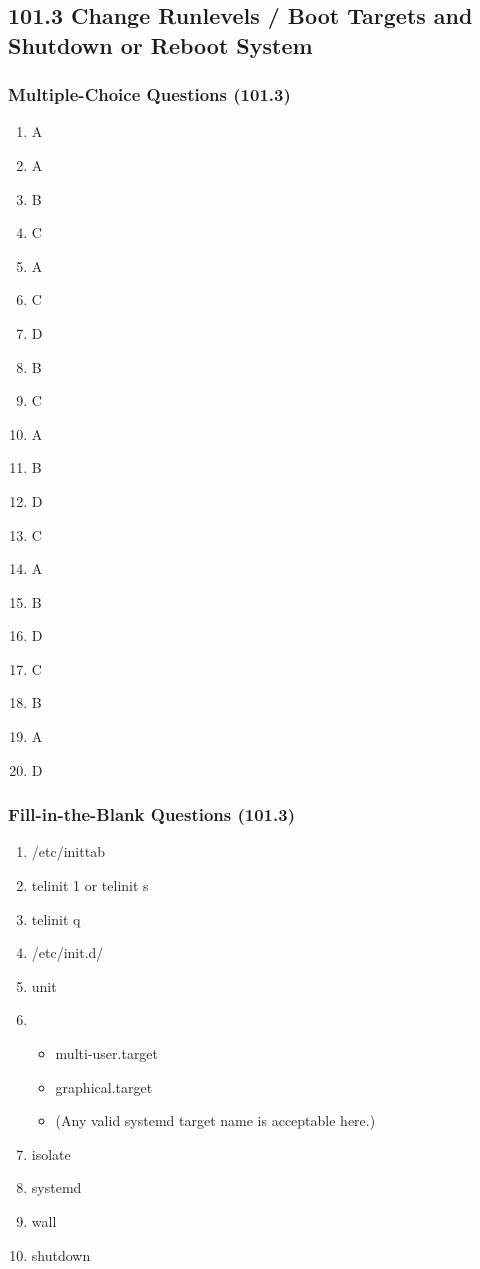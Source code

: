 \documentclass[a4paper]{report}
\begin{document}


    \subsection*{101.3 Change Runlevels / Boot Targets and Shutdown or Reboot System}
    \subsubsection*{Multiple-Choice Questions (101.3)}
    \begin{enumerate}[1.]
    \item A
    \item A
    \item B
    \item C
    \item A
    \item C
    \item D
    \item B
    \item C
    \item A
    \item B
    \item D
    \item C
    \item A
    \item B
    \item D
    \item C
    \item B
    \item A
    \item D
    \end{enumerate}



\subsubsection*{Fill-in-the-Blank Questions (101.3)}
    \begin{enumerate}[1.]
    \item /etc/inittab
    \item telinit 1 or telinit s
    \item telinit q
    \item /etc/init.d/
    \item unit
    \item 
        \begin{itemize}
            \item multi-user.target
            \item graphical.target
            \item (Any valid systemd target name is acceptable here.)
        \end{itemize}
    \item isolate
    \item systemd
    \item wall
    \item shutdown
    \end{enumerate}
\end{document}
